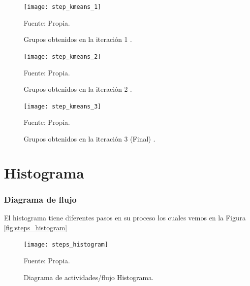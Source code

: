 \begin{figure}[ht]
	\begin{center}
		\texttt{[image: step\_kmeans\_1]}
	\end{center}
	\begin{center}
		\vskip -0.5cm
		\caption{\small{Grupos obtenidos en la iteración 1 .}}
		{\small{Fuente: Propia. }}
	\end{center}
\end{figure}

\begin{figure}[ht]
	\begin{center}
		\texttt{[image: step\_kmeans\_2]}
	\end{center}
	\begin{center}
		\vskip -0.5cm
		\caption{\small{Grupos obtenidos en la iteración 2 .}}
		{\small{Fuente: Propia. }}
	\end{center}
\end{figure}

\begin{figure}[ht]
	\begin{center}
		\texttt{[image: step\_kmeans\_3]}
	\end{center}
	\begin{center}
		\vskip -0.5cm
		\caption{\small{Grupos obtenidos en la iteración 3 (Final) .}}
		{\small{Fuente: Propia. }}
	\end{center}
\end{figure}


\section{Histograma}

\subsubsection{Diagrama de flujo}

El histograma tiene diferentes pasos en su proceso los cuales vemos en la Figura \ref{fig:steps_histogram}

\begin{figure}[ht]
	\begin{center}
		\texttt{[image: steps\_histogram]}
	\end{center}
	\begin{center}
		\vskip -0.5cm
		\caption{\small{Diagrama de actividades/flujo Histograma. }}
		{\small{Fuente: Propia.}}
	\end{center}
\end{figure}

